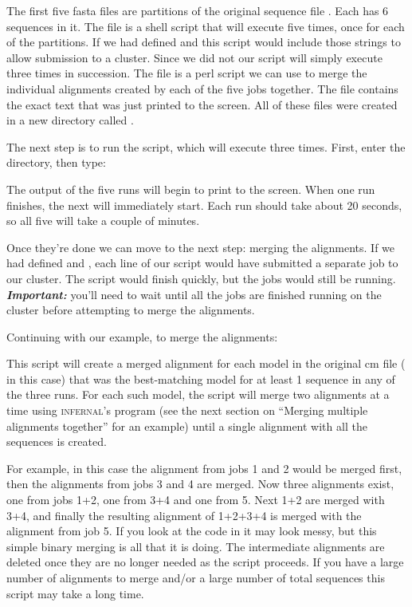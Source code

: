 The first five fasta files are partitions of the original sequence
file . Each has 6 sequences in it. The file
 is a shell script that will execute
 five times, once for each of the partitions. 
If we had defined  and
 this script would include those strings to
allow submission to a cluster. Since we did not our script will simply
execute  three times in succession. The file
 is a perl script we can use to merge the
individual alignments created by each of the five jobs together.
The  file contains the exact text that was just
printed to the screen. All of these files were created in a new
directory called .

The next step is to run the  script, which will
execute  three times. First, enter the
 directory, then type:


The output of the five  runs will begin to print to
the screen. When one run finishes, the next will immediately
start. Each run should take about 20 seconds, so all five will take a
couple of minutes. 

Once they're done we can move to the next step: merging
the alignments. If we had defined  and
, each line of our script would have submitted
a separate job to our cluster. The script would finish quickly, but
the jobs would still be running. \textbf{\emph{Important: }} you'll
need to wait until all the jobs are finished running on the
cluster before attempting to merge the alignments.

Continuing with our example, to merge the alignments:

This script will create a merged alignment for each model in the
original cm file ( in this case) that was the
best-matching model for at least 1 sequence in any of the three runs.
For each such model, the script will merge two alignments at a time
using \textsc{infernal}'s  program (see the next section
on ``Merging multiple alignments together'' for an example)
until a single alignment with all the sequences is created. 

For example, in this case the alignment from jobs 1 and 2 would be
merged first, then the alignments from jobs 3 and 4 are merged. Now
three alignments exist, one from jobs 1+2, one from 3+4 and one from
5. Next 1+2 are merged with 3+4, and finally the resulting alignment
of 1+2+3+4 is merged with the alignment from job 5. If you look at the
code in  it may look messy, but this
simple binary merging is all that it is doing. The intermediate
alignments are deleted once they are no longer needed as the script
proceeds. If you have a large number of alignments to merge and/or a
large number of total sequences this script may take a long time. 

